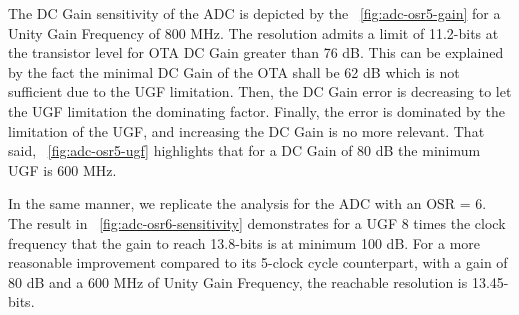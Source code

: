 The DC Gain sensitivity of the ADC is depicted by the \figurename~\ref{fig:adc-osr5-gain} for a Unity Gain Frequency of 800 MHz. The resolution admits a limit of 11.2-bits at the transistor level for OTA DC Gain greater than 76 dB. This can be explained by the fact the minimal DC Gain of the OTA shall be 62 dB which is not sufficient due to the UGF limitation. Then, the DC Gain error is decreasing to let the UGF limitation the dominating factor. Finally, the error is dominated by the limitation of the UGF, and increasing the DC Gain is no more relevant.
That said, \figurename~\ref{fig:adc-osr5-ugf} highlights that for a DC Gain of 80 dB the minimum UGF is 600 MHz.

In the same manner, we replicate the analysis for the ADC with an OSR = 6. The result in \figurename~\ref{fig:adc-osr6-sensitivity} demonstrates for a UGF 8 times the clock frequency that the gain to reach 13.8-bits is at minimum 100 dB. For a more reasonable improvement compared to its 5-clock cycle counterpart, with a gain of 80 dB and a 600 MHz of Unity Gain Frequency, the reachable resolution is 13.45-bits.
